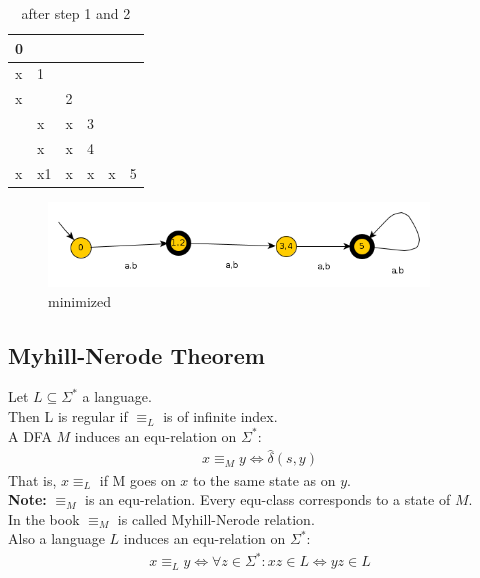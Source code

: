 \documentclass[a4paper]{article}
\begin{document}
    \begin{table}[H]
        \centering
        \begin{tabular}{|l|l|l|l|l|l|}
            \hline
            0\\\hline
            x& 1\\\hline
            x& &2 \\\hline
            & x & x & 3 \\\hline
            & x & x & 4 \\\hline
            x & x1 & x & x & x & 5\\\hline
        \end{tabular}
        \caption{after step 1 and 2}
    \end{table}
    \begin{figure}[H]
        \centering
        \includegraphics[width=0.9\textwidth]{minimized.png}
        \caption{minimized}
    \end{figure}
    \subsection{Myhill-Nerode Theorem}
    Let $L\subseteq \Sigma^*$ a language.\\
    Then L is regular if $\equiv_L$ is of infinite index.\\
    A DFA $M$ induces an equ-relation on $\Sigma^*$:
    \begin{align*}
        x\equiv_M y \Leftrightarrow \hat{\delta}(s,y)
    \end{align*}
    That is, $x \equiv_L$ if M goes on $x$ to the same state as on $y$.
    \\\textbf{Note:} $\equiv_M$ is an equ-relation. Every equ-class corresponds
    to a state of $M$.\\
    In the book $\equiv_M$ is called Myhill-Nerode relation.\\
    Also a language $L$ induces an equ-relation on $\Sigma^*$:
    \begin{align*}
        x\equiv_L y \Leftrightarrow \forall z\in \Sigma^*: xz\in L \Leftrightarrow yz\in L
    \end{align*}
\end{document}
